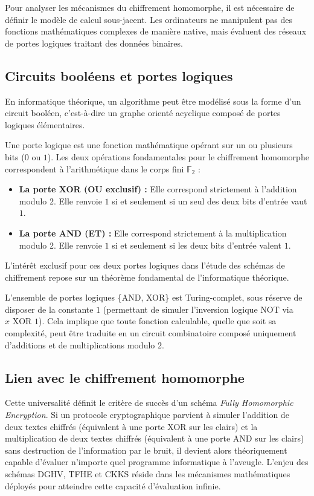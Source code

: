 Pour analyser les mécanismes du chiffrement homomorphe, il est nécessaire de définir le modèle de calcul sous-jacent. Les ordinateurs ne manipulent pas des fonctions mathématiques complexes de manière native, mais évaluent des réseaux de portes logiques traitant des données binaires.

\subsection{Circuits booléens et portes logiques}

En informatique théorique, un algorithme peut être modélisé sous la forme d'un circuit booléen, c'est-à-dire un graphe orienté acyclique composé de portes logiques élémentaires.

\begin{definition}
Une porte logique est une fonction mathématique opérant sur un ou plusieurs bits ($0$ ou $1$). Les deux opérations fondamentales pour le chiffrement homomorphe correspondent à l'arithmétique dans le corps fini $\mathbb{F}_2$ :
\begin{itemize}
    \item \textbf{La porte XOR (OU exclusif) :} Elle correspond strictement à l'addition modulo 2. Elle renvoie $1$ si et seulement si un seul des deux bits d'entrée vaut $1$.
    \item \textbf{La porte AND (ET) :} Elle correspond strictement à la multiplication modulo 2. Elle renvoie $1$ si et seulement si les deux bits d'entrée valent $1$.
\end{itemize}
\end{definition}

L'intérêt exclusif pour ces deux portes logiques dans l'étude des schémas de chiffrement repose sur un théorème fondamental de l'informatique théorique.

\begin{proposition}
L'ensemble de portes logiques \{AND, XOR\} est Turing-complet, sous réserve de disposer de la constante $1$ (permettant de simuler l'inversion logique NOT via $x \text{ XOR } 1$). Cela implique que toute fonction calculable, quelle que soit sa complexité, peut être traduite en un circuit combinatoire composé uniquement d'additions et de multiplications modulo 2.
\end{proposition}

\subsection{Lien avec le chiffrement homomorphe}

Cette universalité définit le critère de succès d'un schéma \textit{Fully Homomorphic Encryption}. Si un protocole cryptographique parvient à simuler l'addition de deux textes chiffrés (équivalent à une porte XOR sur les clairs) et la multiplication de deux textes chiffrés (équivalent à une porte AND sur les clairs) sans destruction de l'information par le bruit, il devient alors théoriquement capable d'évaluer n'importe quel programme informatique à l'aveugle. L'enjeu des schémas DGHV, TFHE et CKKS réside dans les mécanismes mathématiques déployés pour atteindre cette capacité d'évaluation infinie.